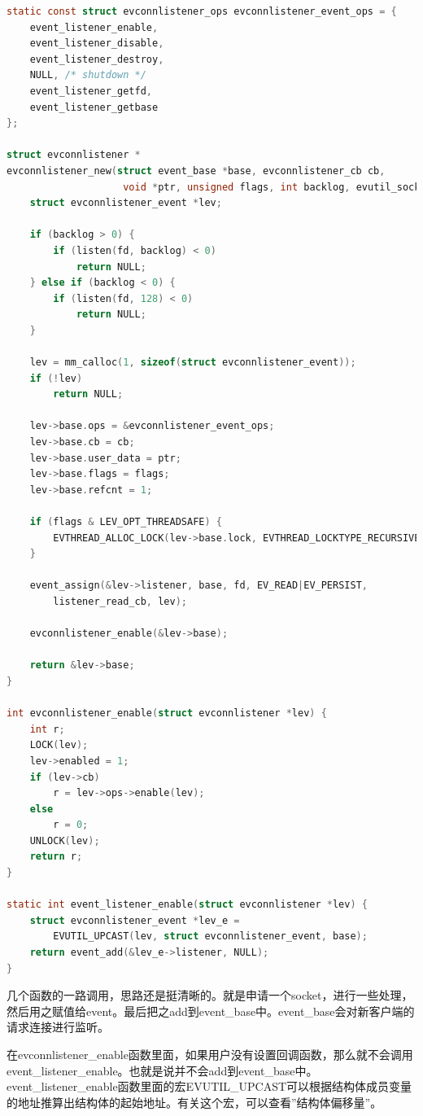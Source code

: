 \documentclass[11pt,a4paper]{article}
\begin{document}
\begin{lstlisting}[language=C]
static const struct evconnlistener_ops evconnlistener_event_ops = {
	event_listener_enable,
	event_listener_disable,
	event_listener_destroy,
	NULL, /* shutdown */
	event_listener_getfd,
	event_listener_getbase
};

struct evconnlistener *
evconnlistener_new(struct event_base *base, evconnlistener_cb cb, 
					void *ptr, unsigned flags, int backlog, evutil_socket_t fd) {
	struct evconnlistener_event *lev;

	if (backlog > 0) {
		if (listen(fd, backlog) < 0)
			return NULL;
	} else if (backlog < 0) {
		if (listen(fd, 128) < 0)
			return NULL;
	}

	lev = mm_calloc(1, sizeof(struct evconnlistener_event));
	if (!lev)
		return NULL;

	lev->base.ops = &evconnlistener_event_ops;
	lev->base.cb = cb;
	lev->base.user_data = ptr;
	lev->base.flags = flags;
	lev->base.refcnt = 1;

	if (flags & LEV_OPT_THREADSAFE) {
		EVTHREAD_ALLOC_LOCK(lev->base.lock, EVTHREAD_LOCKTYPE_RECURSIVE);
	}

	event_assign(&lev->listener, base, fd, EV_READ|EV_PERSIST,
	    listener_read_cb, lev);

	evconnlistener_enable(&lev->base);

	return &lev->base;
}

int evconnlistener_enable(struct evconnlistener *lev) {
	int r;
	LOCK(lev);
	lev->enabled = 1;
	if (lev->cb)
		r = lev->ops->enable(lev);
	else
		r = 0;
	UNLOCK(lev);
	return r;
}

static int event_listener_enable(struct evconnlistener *lev) {
	struct evconnlistener_event *lev_e =
	    EVUTIL_UPCAST(lev, struct evconnlistener_event, base);
	return event_add(&lev_e->listener, NULL);
}
\end{lstlisting}

几个函数的一路调用，思路还是挺清晰的。就是申请一个socket，进行一些处理，然后用之赋值给event。最后把之add到event\_base中。event\_base会对新客户端的请求连接进行监听。

在evconnlistener\_enable函数里面，如果用户没有设置回调函数，那么就不会调用event\_listener\_enable。也就是说并不会add到event\_base中。
event\_listener\_enable函数里面的宏EVUTIL\_UPCAST可以根据结构体成员变量的地址推算出结构体的起始地址。有关这个宏，可以查看”结构体偏移量”。
\end{document}
